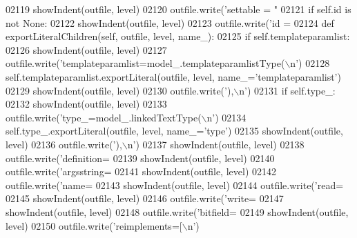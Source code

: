 \begin{DoxyCode}
{{{{{{{{{{{{{{{{{{{{{{{{{{{{{{{{{{{{{{{{{{{{{{{{{{{{{{{{{{{{{{{{{{{{{{{{{{{{{{{{{{{{{{{{{{{{{{{{{{{{{{{{{{{{{{{{{{{{{{{{{{{{{{{{{{{{{{{{{{{{{{{{{{{{{{{{{{{{{{{{{{02119             showIndent(outfile, level)
02120             outfile.write(\textcolor{stringliteral}{'settable = "%
02121         \textcolor{keywordflow}{if} self.id \textcolor{keywordflow}{is} \textcolor{keywordflow}{not} \textcolor{keywordtype}{None}:
02122             showIndent(outfile, level)
02123             outfile.write(\textcolor{stringliteral}{'id = %
02124     \textcolor{keyword}{def }exportLiteralChildren(self, outfile, level, name\_):
02125         \textcolor{keywordflow}{if} self.templateparamlist:
02126             showIndent(outfile, level)
02127             outfile.write(\textcolor{stringliteral}{'templateparamlist=model\_.templateparamlistType(\(\backslash\)n'})
02128             self.templateparamlist.exportLiteral(outfile, level, name\_=\textcolor{stringliteral}{'templateparamlist'})
02129             showIndent(outfile, level)
02130             outfile.write(\textcolor{stringliteral}{'),\(\backslash\)n'})
02131         \textcolor{keywordflow}{if} self.type_:
02132             showIndent(outfile, level)
02133             outfile.write(\textcolor{stringliteral}{'type\_=model\_.linkedTextType(\(\backslash\)n'})
02134             self.type\_.exportLiteral(outfile, level, name\_=\textcolor{stringliteral}{'type'})
02135             showIndent(outfile, level)
02136             outfile.write(\textcolor{stringliteral}{'),\(\backslash\)n'})
02137         showIndent(outfile, level)
02138         outfile.write(\textcolor{stringliteral}{'definition=%
02139         showIndent(outfile, level)
02140         outfile.write(\textcolor{stringliteral}{'argsstring=%
02141         showIndent(outfile, level)
02142         outfile.write(\textcolor{stringliteral}{'name=%
02143         showIndent(outfile, level)
02144         outfile.write(\textcolor{stringliteral}{'read=%
02145         showIndent(outfile, level)
02146         outfile.write(\textcolor{stringliteral}{'write=%
02147         showIndent(outfile, level)
02148         outfile.write(\textcolor{stringliteral}{'bitfield=%
02149         showIndent(outfile, level)
02150         outfile.write(\textcolor{stringliteral}{'reimplements=[\(\backslash\)n'})
}}}}}}}}}}}}}}}}}}}}}}}}}}}}}}}}}}}}}}}}}}}}}}}}}}}}}}}}}}}}}}}}}}}}}}}}}}}}}}}}}}}}}}}}}}}}}}}}}}}}}}}}}}}}}}}}}}}}}}}}}}}}}}}}}}}}}}}}}}}}}}}}}}}}}}}}}}}}}}}}}}}}}}}}}}
\end{DoxyCode}
